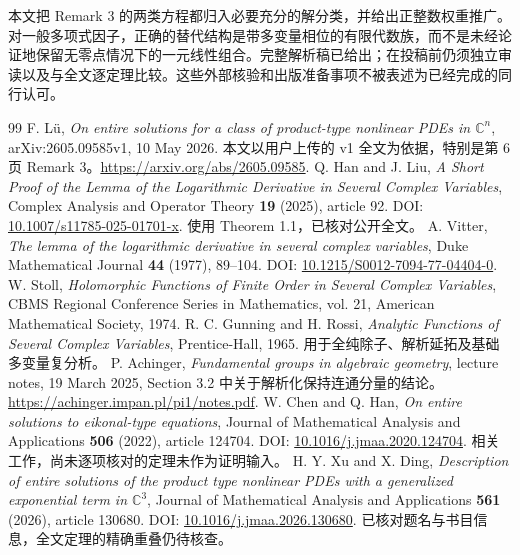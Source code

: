 \documentclass[UTF8,11pt,a4paper,fontset=fandol]{ctexart}
\theoremstyle{definition}\newtheorem{definition}[theorem]{定义}
\theoremstyle{remark}\newtheorem{remark}[theorem]{注}
\newcommand{\C}{\mathbb C}\newcommand{\N}{\mathbb N}
\begin{document}
本文把 Remark 3 的两类方程都归入必要充分的解分类，并给出正整数权重推广。对一般多项式因子，正确的替代结构是带多变量相位的有限代数族，而不是未经论证地保留无零点情况下的一元线性组合。完整解析稿已给出；在投稿前仍须独立审读以及与\cite{XuDing2026,ChenHan2022}全文逐定理比较。这些外部核验和出版准备事项不被表述为已经完成的同行认可。

\begin{thebibliography}{99}
 F. L\"u, \emph{On entire solutions for a class of product-type nonlinear PDEs in $\C^n$}, arXiv:2605.09585v1, 10 May 2026. 本文以用户上传的 v1 全文为依据，特别是第 6 页 Remark 3。\url{https://arxiv.org/abs/2605.09585}.
 Q. Han and J. Liu, \emph{A Short Proof of the Lemma of the Logarithmic Derivative in Several Complex Variables}, Complex Analysis and Operator Theory \textbf{19} (2025), article 92. DOI: \href{https://doi.org/10.1007/s11785-025-01701-x}{10.1007/s11785-025-01701-x}. 使用 Theorem 1.1，已核对公开全文。
 A. Vitter, \emph{The lemma of the logarithmic derivative in several complex variables}, Duke Mathematical Journal \textbf{44} (1977), 89--104. DOI: \href{https://doi.org/10.1215/S0012-7094-77-04404-0}{10.1215/S0012-7094-77-04404-0}.
 W. Stoll, \emph{Holomorphic Functions of Finite Order in Several Complex Variables}, CBMS Regional Conference Series in Mathematics, vol. 21, American Mathematical Society, 1974.
 R. C. Gunning and H. Rossi, \emph{Analytic Functions of Several Complex Variables}, Prentice-Hall, 1965. 用于全纯除子、解析延拓及基础多变量复分析。
 P. Achinger, \emph{Fundamental groups in algebraic geometry}, lecture notes, 19 March 2025, Section 3.2 中关于解析化保持连通分量的结论。\url{https://achinger.impan.pl/pi1/notes.pdf}.
 W. Chen and Q. Han, \emph{On entire solutions to eikonal-type equations}, Journal of Mathematical Analysis and Applications \textbf{506} (2022), article 124704. DOI: \href{https://doi.org/10.1016/j.jmaa.2020.124704}{10.1016/j.jmaa.2020.124704}. 相关工作，尚未逐项核对的定理未作为证明输入。
 H. Y. Xu and X. Ding, \emph{Description of entire solutions of the product type nonlinear PDEs with a generalized exponential term in $\C^3$}, Journal of Mathematical Analysis and Applications \textbf{561} (2026), article 130680. DOI: \href{https://doi.org/10.1016/j.jmaa.2026.130680}{10.1016/j.jmaa.2026.130680}. 已核对题名与书目信息，全文定理的精确重叠仍待核查。
\end{thebibliography}
\end{document}
